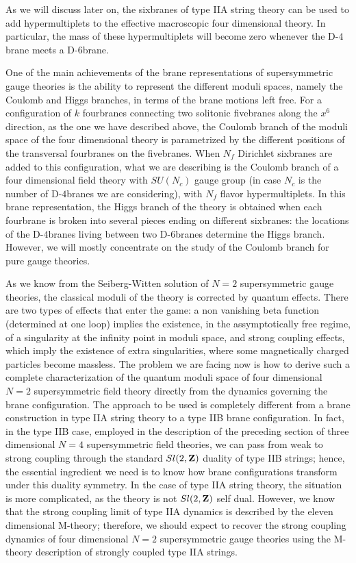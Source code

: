 As we will discuss later on, the sixbranes of type IIA string
theory can be used to add hypermultiplets to the effective
macroscopic four dimensional theory. In particular, the mass of
these hypermultiplets will become zero whenever the D-$4$brane
meets a D-$6$brane. 
  
One of the main achievements of the brane representations of
supersymmetric gauge theories is the ability to represent the
different moduli spaces, namely the Coulomb and Higgs branches,
in terms of the brane motions left free. For a configuration of
$k$ fourbranes connecting two solitonic fivebranes along the
$x^6$ direction, as the one we have described above, the Coulomb
branch of the moduli space of the four dimensional theory is
parametrized by the different positions of the transversal
fourbranes on the fivebranes. When $N_f$ Dirichlet sixbranes are added
to this configuration, what we are describing is the Coulomb
branch of a four dimensional field theory with $SU(N_c)$ gauge group (in case
$N_c$ is the number of D-$4$branes we are considering), with
$N_f$ flavor hypermultiplets. In this brane representation, the
Higgs branch of the theory is obtained when each fourbrane is
broken into several pieces ending on different sixbranes: the
locations of the D-$4$branes living between two D-$6$branes
determine the Higgs branch. However, we will mostly concentrate
on the study of the Coulomb branch for pure gauge theories.
  
As we know from the Seiberg-Witten solution of $N=2$
supersymmetric gauge theories, the classical moduli of the theory
is corrected by quantum effects. There are two types of effects
that enter the game: a non vanishing beta function (determined at 
one loop) implies the existence, in the assymptotically free regime, of a
singularity at the infinity point in moduli space, and strong
coupling effects, which imply the existence of extra
singularities, where some magnetically charged particles become
massless. The problem we are facing now is how to derive such a
complete characterization of the quantum moduli space of four
dimensional $N=2$ supersymmetric field theory directly from the
dynamics governing the brane configuration. The approach to be
used is completely different from a brane construction in type
IIA string theory to a type IIB brane configuration. In fact, in
the type IIB case, employed in the description of the preceding
section of three dimensional $N=4$ supersymmetric field theories,
we can pass from weak to strong coupling through the standard
$Sl(2,{\bf Z})$ duality of type IIB strings; hence, the essential
ingredient we need is to know how brane configurations transform
under this duality symmetry. In the case of type IIA string
theory, the situation is more complicated, as the theory is not
$Sl(2,{\bf Z})$ self dual. However, we know that the strong
coupling limit of type IIA dynamics is described by the eleven
dimensional M-theory; therefore, we should expect to recover the
strong coupling dynamics of four dimensional $N=2$ supersymmetric
gauge theories using the M-theory description of strongly coupled
type IIA strings.
  
